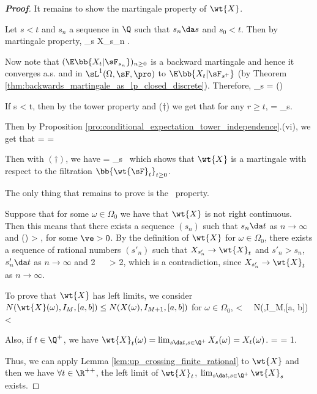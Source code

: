 \begin{proof}[\bf Proof]
It remains to show the martingale property of $\wt{X}$.

Let $s < t$ and $s_n$ a sequence in $\Q$ such that $s_n \da s$ and $s_0 < t$. Then by martingale property,
\be
{}_s  \lim X_{s_n}    \lim \E{}.
\ee

Now note that $(\E\bb{X_t|\sF_{s_n}})_{n\geq 0}$ is a backward martingale and hence it converges a.s. and in $\sL^1(\Omega,\sF,\pro)$ to $\E\bb{X_t|\sF_{s^+}}$ (by Theorem \ref{thm:backwards_martingale_as_lp_closed_discrete}). Therefore,
\be
{}_s = \E{}\quad {}\quad\quad (\dag)
\ee

If s < t, then by the tower property and ($\dag$) we get that for any $r\geq t$,
\be
\E{} = \E{}   \E {}   _s.
\ee

Then by Proposition \ref{pro:conditional_expectation_tower_independence}.(vi), we get that
\be
\E{} = \E{} = \E{} \ 
\ee

Then with $(\dag)$, we have
\be
\E{} = _s\ 
\ee
which shows that $\wt{X}$ is a martingale with respect to the filtration $\bb{\wt{\sF}_t}_{t\geq 0}$.

The only thing that remains to prove is the \cadlag\ property.

Suppose that for some $\omega \in \Omega_0$ we have that $\wt{X}$ is not right continuous. Then this means that there exists a sequence $(s_n)$ such that $s_n \da t$ as $n \to\infty$ and
\be
{}(\omega) > \ve,
\ee
for some $\ve > 0$. By the definition of $\wt{X}$ for $\omega \in \Omega_0$, there exists a sequence of rational numbers $(s'_n)$ such that $X_{s'_n} \to \wt{X}_t$ and $s'_n > s_n$, $s'_n \da t$ as $n \to \infty$ and
\be
{} \leq \frac {\ve}2 \ \ra \  > \frac {\ve}2,
\ee
which is a contradiction, since $X_{s'_n} \to \wt{X}_t$ as $n \to \infty$.

To prove that $\wt{X}$ has left limits, we consider $N(\wt{X}(\omega),I_M,[a, b]) \leq N(X(\omega),I_{M+1},[a, b])$ for $\omega \in \Omega_0$,
\be
\E{} \leq \E{} < \infty \ \ra \ N(,I_M,[a, b]) < \infty{}
\ee

Also, if $t\in \Q^+$, we have $\wt{X}_t(\omega) = \lim_{s\da t,s\in \Q^+}X_s(\omega) = X_t(\omega)$.
\be
\pro{} = \pro{} = 1.
\ee

Thus, we can apply Lemma \ref{lem:up_crossing_finite_rational} to $\wt{X}$ and then we have $\forall t\in \R^{++}$, the left limit of $\wt{X}_t$, $\lim_{s\da t,s\in \Q^+}\wt{X}_s$ exists.%
\end{proof}


